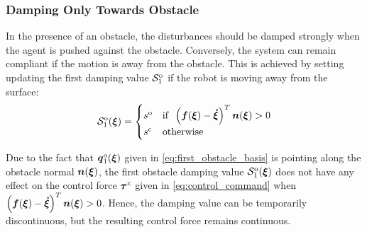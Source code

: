 \subsubsection{Damping Only Towards Obstacle} \label{sec:damping_only_toward}
In the presence of an obstacle, the disturbances should be damped strongly when the agent is pushed against the obstacle. Conversely, the system can remain compliant if the motion is away from the obstacle. This is achieved by setting updating the first damping value $\mathcal{S}^{\mathrm{o}}_1$ if the robot is moving away from the surface:
\begin{equation}
  \matd{S}_1^{\mathrm{o}} (\vecs \xi) =
  \begin{cases}
    s^{\mathrm{o}} & \text{if} \;\; \left(\vect f(\vecs \xi) - \vecs{\dot \xi} \right)^T \vecs n(\vect \xi) > 0 \\
    s^{\mathrm{c}} & \text{otherwise}
  \end{cases}
  \label{eq:leaving_compliance}
\end{equation}

Due to the fact that $\boldsymbol{q}_1^o(\boldsymbol{\xi})$ given in \eqref{eq:first_obstacle_basis} is pointing along the obstacle normal $\boldsymbol{n}(\boldsymbol{\xi})$, the first obstacle damping value $\mathcal{S}_1^{\mathrm{o}} (\boldsymbol{\xi})$ does not have any effect on the control force $\boldsymbol{\tau}^c$ given in \eqref{eq:control_command} when $\left(\boldsymbol{f}(\boldsymbol{\xi}) -  \boldsymbol{\dot \xi} \right)^T \boldsymbol{n}(\boldsymbol{\xi}) > 0$.
Hence, the damping value can be temporarily discontinuous, but the resulting control force remains continuous.


